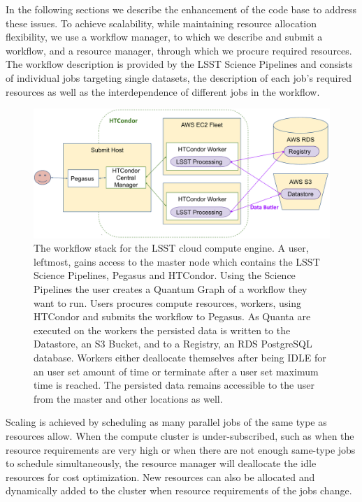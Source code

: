 \documentclass[a4paper, 10pt, conference]{ieeeconf}
\begin{document}


In the following sections we describe the enhancement of the code base to address these issues. To achieve scalability, while maintaining  resource allocation flexibility, we use a workflow manager, to which we describe and submit a workflow, and a resource manager, through which we procure required resources. The workflow description is provided by the LSST Science Pipelines and consists of individual jobs targeting single datasets, the description of each job's required resources as well as the interdependence of different jobs in the workflow. 
\begin{figure}[htb]
\centering
\includegraphics[width=\columnwidth]{figures/workflow.png}
\caption{The workflow stack for the LSST cloud compute engine. A user, leftmost, gains access to the master node which contains the LSST Science Pipelines, Pegasus and HTCondor. Using the Science Pipelines the user creates a Quantum Graph of a workflow they want to run. Users procures compute resources, workers, using HTCondor and submits the workflow to Pegasus. As Quanta are executed on the workers the persisted data is written to the Datastore, an S3 Bucket, and to a Registry, an RDS PostgreSQL database. Workers either deallocate themselves after being IDLE for an user set amount of time or terminate after a user set maximum time is reached. The persisted data remains accessible to the user from the master and other locations as well.}
\label{fig:techstack}
\end{figure}
Scaling is achieved by scheduling as many parallel jobs of the same type as resources allow. When the compute cluster is under-subscribed, such as when the resource requirements are very high or when there are not enough same-type jobs to schedule simultaneously, the resource manager will deallocate the idle resources for cost optimization. New resources can also be allocated and dynamically added to the cluster when resource requirements of the jobs change. 
\end{document}
